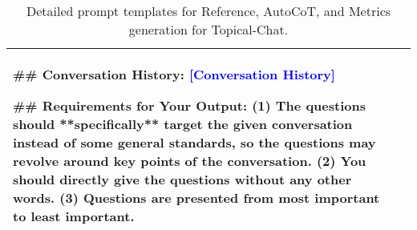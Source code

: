 \begin{table*} [t]
{\begin{tabular}{l >{\raggedright\arraybackslash}m{}}
\#\# Conversation History: \newline
\textcolor{blue}{[Conversation History]} \newline

\#\# Requirements for Your Output: \newline
(1) The questions should **specifically** target the given conversation instead of some general standards, so the questions may revolve around key points of the conversation. \newline
(2) You should directly give the questions without any other words. \newline
(3) Questions are presented from most important to least important. \\
\bottomrule
\end{tabular}
}
\vspace{-2mm}
\caption{Detailed prompt templates for Reference, AutoCoT, and Metrics generation for Topical-Chat. }
\label{tab:generation_prompt_topical_chat}
\end{table*}